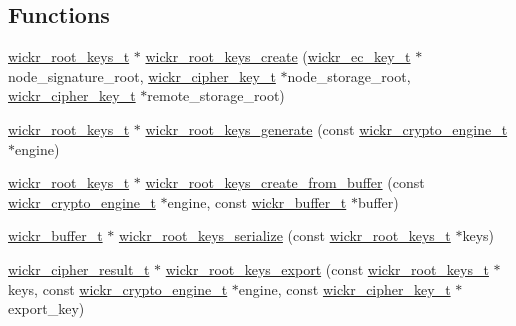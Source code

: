\subsection*{Functions}
\begin{DoxyCompactItemize}
\item 
\mbox{\hyperlink{structwickr__root__keys}{wickr\+\_\+root\+\_\+keys\+\_\+t}} $\ast$ \mbox{\hyperlink{group__wickr__root__keys_gab6289774ce4bcbdc08584695f9b7c34c}{wickr\+\_\+root\+\_\+keys\+\_\+create}} (\mbox{\hyperlink{structwickr__ec__key}{wickr\+\_\+ec\+\_\+key\+\_\+t}} $\ast$node\+\_\+signature\+\_\+root, \mbox{\hyperlink{structwickr__cipher__key}{wickr\+\_\+cipher\+\_\+key\+\_\+t}} $\ast$node\+\_\+storage\+\_\+root, \mbox{\hyperlink{structwickr__cipher__key}{wickr\+\_\+cipher\+\_\+key\+\_\+t}} $\ast$remote\+\_\+storage\+\_\+root)
\item 
\mbox{\hyperlink{structwickr__root__keys}{wickr\+\_\+root\+\_\+keys\+\_\+t}} $\ast$ \mbox{\hyperlink{group__wickr__root__keys_gac6d33868c25a85e5da5cff92a4eab189}{wickr\+\_\+root\+\_\+keys\+\_\+generate}} (const \mbox{\hyperlink{structwickr__crypto__engine}{wickr\+\_\+crypto\+\_\+engine\+\_\+t}} $\ast$engine)
\item 
\mbox{\hyperlink{structwickr__root__keys}{wickr\+\_\+root\+\_\+keys\+\_\+t}} $\ast$ \mbox{\hyperlink{group__wickr__root__keys_ga5ab25c65aa25fbe96d978f8e06376653}{wickr\+\_\+root\+\_\+keys\+\_\+create\+\_\+from\+\_\+buffer}} (const \mbox{\hyperlink{structwickr__crypto__engine}{wickr\+\_\+crypto\+\_\+engine\+\_\+t}} $\ast$engine, const \mbox{\hyperlink{structwickr__buffer}{wickr\+\_\+buffer\+\_\+t}} $\ast$buffer)
\item 
\mbox{\hyperlink{structwickr__buffer}{wickr\+\_\+buffer\+\_\+t}} $\ast$ \mbox{\hyperlink{group__wickr__root__keys_ga6875c9f677c4ec127276714976a623a5}{wickr\+\_\+root\+\_\+keys\+\_\+serialize}} (const \mbox{\hyperlink{structwickr__root__keys}{wickr\+\_\+root\+\_\+keys\+\_\+t}} $\ast$keys)
\item 
\mbox{\hyperlink{structwickr__cipher__result}{wickr\+\_\+cipher\+\_\+result\+\_\+t}} $\ast$ \mbox{\hyperlink{group__wickr__root__keys_ga6e3a04e7e1c65ada93450051eb4f4459}{wickr\+\_\+root\+\_\+keys\+\_\+export}} (const \mbox{\hyperlink{structwickr__root__keys}{wickr\+\_\+root\+\_\+keys\+\_\+t}} $\ast$keys, const \mbox{\hyperlink{structwickr__crypto__engine}{wickr\+\_\+crypto\+\_\+engine\+\_\+t}} $\ast$engine, const \mbox{\hyperlink{structwickr__cipher__key}{wickr\+\_\+cipher\+\_\+key\+\_\+t}} $\ast$export\+\_\+key)
\item 

\end{DoxyCompactItemize}

